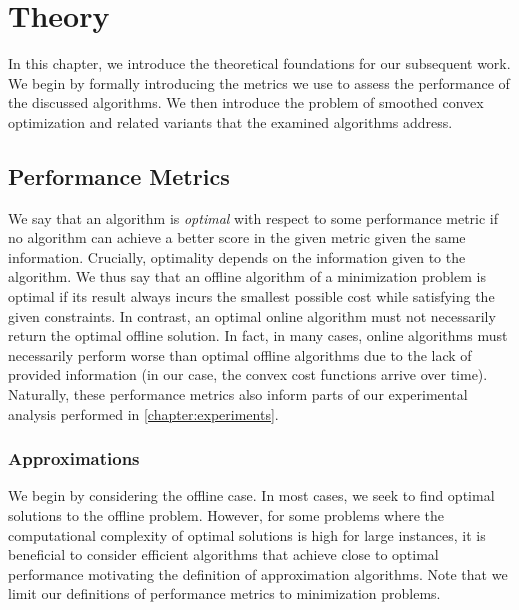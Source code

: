 
\chapter{Theory}\label{chapter:theory}

In this chapter, we introduce the theoretical foundations for our subsequent work. We begin by formally introducing the metrics we use to assess the performance of the discussed algorithms. We then introduce the problem of smoothed convex optimization and related variants that the examined algorithms address.

\section{Performance Metrics}\label{section:theory:performance_metrics}

We say that an algorithm is \textit{optimal} with respect to some performance metric if no algorithm can achieve a better score in the given metric given the same information. Crucially, optimality depends on the information given to the algorithm. We thus say that an offline algorithm of a minimization problem is optimal if its result always incurs the smallest possible cost while satisfying the given constraints. In contrast, an optimal online algorithm must not necessarily return the optimal offline solution. In fact, in many cases, online algorithms must necessarily perform worse than optimal offline algorithms due to the lack of provided information (in our case, the convex cost functions arrive over time). Naturally, these performance metrics also inform parts of our experimental analysis performed in \autoref{chapter:experiments}.

\subsection{Approximations}

We begin by considering the offline case. In most cases, we seek to find optimal solutions to the offline problem. However, for some problems where the computational complexity of optimal solutions is high for large instances, it is beneficial to consider efficient algorithms that achieve close to optimal performance motivating the definition of approximation algorithms. Note that we limit our definitions of performance metrics to minimization problems.

